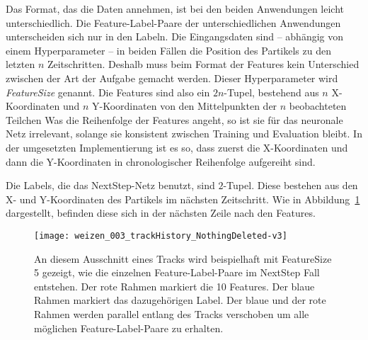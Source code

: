 
Das Format, das die Daten annehmen, ist bei den beiden Anwendungen leicht unterschiedlich.
Die Feature-Label-Paare der unterschiedlichen Anwendungen unterscheiden sich nur in den Labeln.
Die Eingangsdaten sind -- abhängig von einem Hyperparameter --
in beiden Fällen die Position des Partikels zu den letzten \(n\) Zeitschritten.
Deshalb muss beim Format der Features kein Unterschied zwischen der Art der Aufgabe gemacht werden.
Dieser Hyperparameter wird \textit{FeatureSize} genannt. 
Die Features sind also ein \(2n\)-Tupel, bestehend aus \(n\) X-Koordinaten und \(n\) Y-Koordinaten 
von den Mittelpunkten der \(n\) beobachteten Teilchen
Was die Reihenfolge der Features angeht, so ist sie für das neuronale Netz irrelevant, 
solange sie konsistent zwischen Training und Evaluation bleibt. 
In der umgesetzten Implementierung ist es so, dass zuerst die X-Koordinaten 
und dann die Y-Koordinaten in chronologischer Reihenfolge aufgereiht sind. 



Die Labels, die das NextStep-Netz benutzt, sind \(2\)-Tupel.
Diese bestehen aus den X- und Y-Koordinaten des Partikels im nächsten Zeitschritt.
Wie in Abbildung~\ref{fig:FLPNext} dargestellt, befinden diese sich in der nächsten Zeile nach den Features.

\begin{figure}
	\centering
	\texttt{[image: weizen\_003\_trackHistory\_NothingDeleted-v3]}
	\caption[Beispiel Feature-Label-Paar NextStep]{An diesem Ausschnitt eines Tracks wird beispielhaft mit FeatureSize 5 gezeigt, wie die einzelnen Feature-Label-Paare im NextStep Fall entstehen.
		Der rote Rahmen markiert die 10 Features. Der blaue Rahmen markiert das dazugehörigen Label. 
		Der blaue und der rote Rahmen werden parallel entlang des Tracks verschoben um alle möglichen Feature-Label-Paare zu erhalten. }
	\label{fig:FLPNext}
\end{figure}


